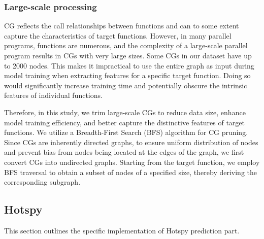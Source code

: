 \documentclass[lineno,sn-mathphys]{sn-jnl}%
\theoremstyle{thmstyleone}%
\theoremstyle{thmstyletwo}%
\theoremstyle{thmstylethree}%
\begin{document}
\subsubsection{Large-scale processing}
CG reflects the call relationships between functions and can to some extent capture the characteristics of target functions. However, in many parallel programs, functions are numerous, and the complexity of a large-scale parallel program results in CGs with very large sizes. Some CGs in our dataset have up to 2000 nodes. This makes it impractical to use the entire graph as input during model training when extracting features for a specific target function. Doing so would significantly increase training time and potentially obscure the intrinsic features of individual functions.\par
Therefore, in this study, we trim large-scale CGs to reduce data size, enhance model training efficiency, and better capture the distinctive features of target functions. We utilize a Breadth-First Search (BFS) algorithm for CG pruning. Since CGs are inherently directed graphs, to ensure uniform distribution of nodes and prevent bias from nodes being located at the edges of the graph, we first convert CGs into undirected graphs. Starting from the target function, we employ BFS traversal to obtain a subset of nodes of a specified size, thereby deriving the corresponding subgraph.

\subsection{Hotspy}
This section outlines the specific implementation of Hotspy prediction part.
\end{document}
